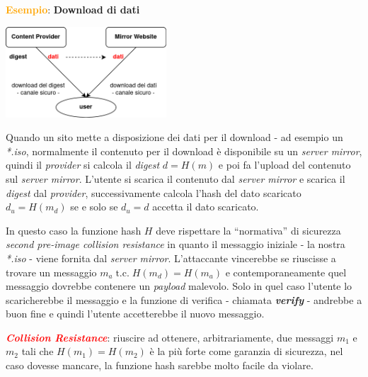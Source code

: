 \begin{boxA}
    \textcolor{orange}{\textbf{Esempio}}: \textbf{Download di dati}

    \medskip

    {\centering
        \includegraphics[width=0.45\textwidth]{img/hash_es.png}
    \par}

    Quando un sito mette a disposizione dei dati per il download - ad esempio un \textit{*.iso}, normalmente il contenuto per il download è disponibile su un \textit{server mirror}, quindi il \textit{provider} si calcola il \textit{digest} $d = H(m)$ e poi fa l'upload del contenuto sul \textit{server mirror}. L'utente si scarica il contenuto dal \textit{server mirror} e scarica il \textit{digest} dal \textit{provider}, successivamente calcola l'hash del dato scaricato $d_u = H(m_d)$ se e solo se $d_u = d$ accetta il dato scaricato.

    \smallskip

    In questo caso la funzione hash $H$ deve rispettare la ``normativa'' di sicurezza \textit{second pre-image collision resistance} in quanto il messaggio iniziale - la nostra \textit{*.iso} - viene fornita dal \textit{server mirror}. L'attaccante vincerebbe se riuscisse a trovare un messaggio $m_a \; \text{t.c.} \; H(m_d) = H(m_a)$ e contemporaneamente quel messaggio dovrebbe contenere un \textit{payload} malevolo. Solo in quel caso l'utente lo scaricherebbe il messaggio e la funzione di verifica - chiamata \textbf{\textit{verify}} - andrebbe a buon fine e quindi l'utente accetterebbe il nuovo messaggio.
\end{boxA}

\begin{flushleft}
    \textcolor{red}{\textbf{\textit{Collision Resistance}}}: riuscire ad ottenere, arbitrariamente, due messaggi $m_1$ e $m_2$ tali che $H(m_1) = H(m_2)$ è la più forte come garanzia di sicurezza, nel caso dovesse mancare, la funzione hash sarebbe molto facile da violare.
\end{flushleft}

